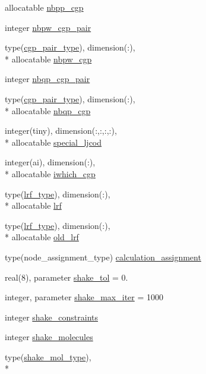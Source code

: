 \begin{DoxyCompactItemize}
allocatable \hyperlink{classmd_a87ed8e074047fb2d7019c52e807836fb}{nbpp\-\_\-cgp}
\item 
integer \hyperlink{classmd_a7ec7cb1c5afce9586baea890420e654a}{nbpw\-\_\-cgp\-\_\-pair}
\item 
type(\hyperlink{structmd_1_1cgp__pair__type}{cgp\-\_\-pair\-\_\-type}), dimension(\-:), \\*
allocatable \hyperlink{classmd_afb029767cdf177966fd8074ab061d39c}{nbpw\-\_\-cgp}
\item 
integer \hyperlink{classmd_a1463121ef43a1891ee0f918e61e2fdd2}{nbqp\-\_\-cgp\-\_\-pair}
\item 
type(\hyperlink{structmd_1_1cgp__pair__type}{cgp\-\_\-pair\-\_\-type}), dimension(\-:), \\*
allocatable \hyperlink{classmd_aad111b28d02d9cca0481c8841da0864a}{nbqp\-\_\-cgp}
\item 
integer(tiny), dimension(\-:,\-:,\-:,\-:), \\*
allocatable \hyperlink{classmd_a7bc57570fb5b99d046c51d067c6aeb09}{special\-\_\-ljcod}
\item 
integer(ai), dimension(\-:), \\*
allocatable \hyperlink{classmd_ae1eeb6fb5da11e0cbed4087c6bcd8390}{iwhich\-\_\-cgp}
\item 
type(\hyperlink{structmd_1_1lrf__type}{lrf\-\_\-type}), dimension(\-:), \\*
allocatable \hyperlink{classmd_a17367768665a497aaa4afa1398cd791f}{lrf}
\item 
type(\hyperlink{structmd_1_1lrf__type}{lrf\-\_\-type}), dimension(\-:), \\*
allocatable \hyperlink{classmd_a721ce8c8d5a907169c25db6076cbae89}{old\-\_\-lrf}
\item 
type(node\-\_\-assignment\-\_\-type) \hyperlink{classmd_a07e79a91529355df9df5700e3c691152}{calculation\-\_\-assignment}
\item 
real(8), parameter \hyperlink{classmd_a026535969397ae3013660c511eaf0dea}{shake\-\_\-tol} = 0.
\item 
integer, parameter \hyperlink{classmd_a3f9ba2f45bcb22883b562a1a5d6e0d8d}{shake\-\_\-max\-\_\-iter} = 1000
\item 
integer \hyperlink{classmd_a99577f63ed7ff20cb8547fc842f3abed}{shake\-\_\-constraints}
\item 
integer \hyperlink{classmd_a00c71fcab952096238416ea504436e39}{shake\-\_\-molecules}
\item 
type(\hyperlink{structmd_1_1shake__mol__type}{shake\-\_\-mol\-\_\-type}), \\*

\end{DoxyCompactItemize}
